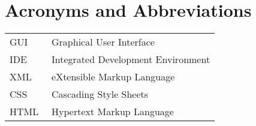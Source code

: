 \chapter*{Acronyms and Abbreviations}

\begin{flushleft}
\begin{tabular}{l p{0.8\linewidth}}
	
GUI&	Graphical User Interface\\
IDE &Integrated Development Environment \\	
XML	&eXtensible Markup Language\\
CSS &Cascading Style Sheets\\
HTML &Hypertext Markup Language\

\end{tabular}
\end{flushleft}

